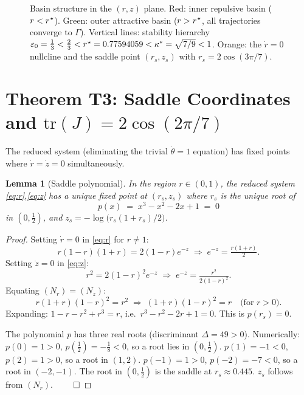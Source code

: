 \documentclass[12pt,a4paper]{article}
\theoremstyle{plain}
\newtheorem{lemma}[theorem]{Lemma}
\theoremstyle{definition}
\theoremstyle{remark}
\newcommand{\rstar}{r^{\kern0.5pt\star}}
\begin{document}
\begin{figure}[h]
\caption{Basin structure in the $(r,z)$ plane.
Red: inner repulsive basin ($r<\rstar$).
Green: outer attractive basin ($r>\rstar$, all trajectories converge to $\Gamma$).
Vertical lines: stability hierarchy
$\varepsilon_0=\tfrac{1}{3}<\tfrac{2}{3}<\rstar=0.77594059<\kappa^*=\sqrt{7/9}<1$.
Orange: the $\dot{r}=0$ nullcline and the saddle point $(r_s,z_s)$ with
$r_s=2\cos(3\pi/7)$.}
\label{fig:basin}
\end{figure}

\section{Theorem T3: Saddle Coordinates and $\mathrm{tr}(J)=2\cos(2\pi/7)$}
\label{sec:T3}

The reduced system (eliminating the trivial $\dot\theta=1$ equation) has fixed points
where $\dot r=\dot z=0$ simultaneously.

\begin{lemma}[Saddle polynomial]\label{lem:poly}
In the region $r\in(0,1)$, the reduced system \eqref{eq:r},\eqref{eq:z} has a unique
fixed point at $(r_s,z_s)$ where $r_s$ is the unique root of
\begin{equation}
  p(x) \;=\; x^3 - x^2 - 2x + 1 \;=\; 0
  \label{eq:poly}
\end{equation}
in $(0,\tfrac{1}{2})$, and $z_s=-\log\!\bigl(r_s(1+r_s)/2\bigr)$.
\end{lemma}

\begin{proof}
Setting $\dot r=0$ in \eqref{eq:r} for $r\neq1$:
\[
  r(1-r)(1+r) = 2(1-r)e^{-z}
  \;\Longrightarrow\;
  e^{-z} = \tfrac{r(1+r)}{2}. \tag{$N_r$}
\]
Setting $\dot z=0$ in \eqref{eq:z}:
\[
  r^2 = 2(1-r)^2 e^{-z}
  \;\Longrightarrow\;
  e^{-z} = \tfrac{r^2}{2(1-r)^2}. \tag{$N_z$}
\]
Equating $(N_r)=(N_z)$:
\[
  r(1+r)(1-r)^2 = r^2
  \;\Longrightarrow\;
  (1+r)(1-r)^2 = r \quad\text{(for }r>0\text{)}.
\]
Expanding: $1-r-r^2+r^3=r$, i.e.\ $r^3-r^2-2r+1=0$. This is $p(r_s)=0$.

The polynomial $p$ has three real roots (discriminant $\Delta=49>0$).
Numerically: $p(0)=1>0$, $p(\tfrac{1}{2})=-\tfrac{1}{8}<0$, so a root lies in
$(0,\tfrac{1}{2})$.
$p(1)=-1<0$, $p(2)=1>0$, so a root in $(1,2)$.
$p(-1)=1>0$, $p(-2)=-7<0$, so a root in $(-2,-1)$.
The root in $(0,\tfrac{1}{2})$ is the saddle at $r_s\approx0.445$.
$z_s$ follows from $(N_r)$. $\qed$
\end{proof}
\end{document}
